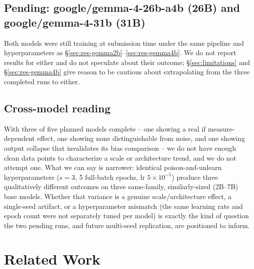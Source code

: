 \documentclass[runningheads]{llncs}
\begin{document}
\subsection{Pending: google/gemma-4-26b-a4b (26B) and google/gemma-4-31b (31B)}
\label{sec:results-pending}
Both models were still training at submission time under the same pipeline and hyperparameters as \S\ref{sec:res-gemma2b}--\ref{sec:res-gemma4b}. We do not report results for either and do not speculate about their outcome; \S\ref{sec:limitations} and \S\ref{sec:res-gemma4b} give reason to be cautious about extrapolating from the three completed runs to either.

\subsection{Cross-model reading}
With three of five planned models complete -- one showing a real if measure-dependent effect, one showing none distinguishable from noise, and one showing output collapse that invalidates its bias comparison -- we do not have enough clean data points to characterize a scale or architecture trend, and we do not attempt one. What we can say is narrower: identical poison-and-unlearn hyperparameters ($s{=}3$, 5 full-batch epochs, lr $5\times10^{-5}$) produce three qualitatively different outcomes on three same-family, similarly-sized (2B--7B) base models. Whether that variance is a genuine scale/architecture effect, a single-seed artifact, or a hyperparameter mismatch (the same learning rate and epoch count were not separately tuned per model) is exactly the kind of question the two pending runs, and future multi-seed replication, are positioned to inform.

\section{Related Work}
\end{document}
